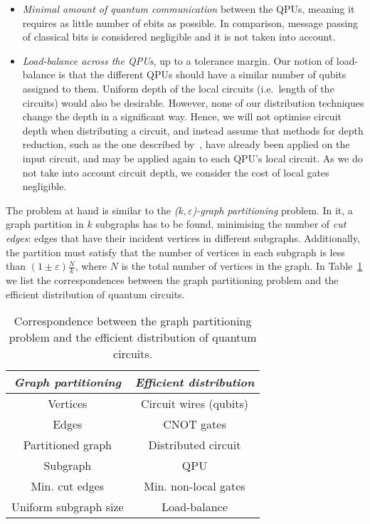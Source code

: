 \begin{itemize}
  \item \textit{Minimal amount of quantum communication} between the QPUs, meaning it requires as little number of ebits as possible. In comparison, message passing of classical bits is considered negligible and it is not taken into account.
  \item \textit{Load-balance across the QPUs}, up to a tolerance margin. Our notion of load-balance is that the different QPUs should have a similar number of qubits assigned to them. Uniform depth of the local circuits (i.e.\ length of the circuits) would also be desirable. However, none of our distribution techniques change the depth in a significant way. Hence, we will not optimise circuit depth when distributing a circuit, and instead assume that methods for depth reduction, such as the one described by~\citet{DepthReduction}, have already been applied on the input circuit, and may be applied again to each QPU's local circuit. As we do not take into account circuit depth, we consider the cost of local gates negligible.
\end{itemize}

The problem at hand is similar to the  \textit{(\(k,\varepsilon\))-graph partitioning} problem. In it, a graph partition in \(k\) subgraphs has to be found, minimising the number of \textit{cut edges}: edges that have their incident vertices in different subgraphs. Additionally, the partition must satisfy that the number of vertices in each subgraph is less than \((1 \pm \varepsilon)\frac{N}{k}\), where \(N\) is the total number of vertices in the graph. In Table~\ref{tab:matching} we list the correspondences between the graph partitioning problem and the efficient distribution of quantum circuits.

\begin{table}
\caption{Correspondence between the graph partitioning problem and the efficient distribution of quantum circuits.}
\label{tab:matching}
\centering
\begin{tabular}{|c|c|}
\hline
\textit{Graph partitioning} & \textit{Efficient distribution} \\
\hline
Vertices & Circuit wires (qubits) \\
Edges & CNOT gates \\
Partitioned graph & Distributed circuit \\
Subgraph & QPU \\
Min. cut edges & Min. non-local gates \\
Uniform subgraph size & Load-balance \\
\hline
\end{tabular}
\end{table}

